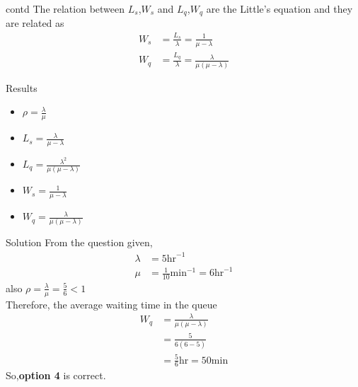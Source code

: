 \documentclass{beamer}
\begin{document}
\begin{frame}{contd}
    The relation between $L_s$,$W_s$ and $L_q$,$W_q$ are the Little's equation and they are related as
\begin{align}
    W_s&=\frac{L_s}{\lambda}=\frac{1}{\mu-\lambda}\\
    W_q&=\frac{L_q}{\lambda}=\frac{\lambda}{\mu(\mu-\lambda)}
\end{align}
\begin{block}{Results}
\begin{itemize}
    \item $\rho=\frac{\lambda}{\mu}$
    \item $L_s=\frac{\lambda}{\mu-\lambda}$
    \item $L_q=\frac{\lambda^2}{\mu(\mu-\lambda)}$
    \item $W_s=\frac{1}{\mu-\lambda}$
    \item $W_q=\frac{\lambda}{\mu(\mu-\lambda)}$
\end{itemize}
\end{block}
\end{frame}
\begin{frame}{Solution}
From the question given,
\begin{align*}
    \lambda &=5\text{hr}^{-1}\\
    \mu&=\frac{1}{10}\text{min}^{-1} =6\text{hr}^{-1}
    \end{align*}
also $\rho=\frac{\lambda}{\mu}=\frac{5}{6}<1$\\
Therefore, the average waiting time in the queue 
\begin{align*}
    W_q&=\frac{\lambda}{\mu(\mu-\lambda)}\\
    &=\frac{5}{6(6-5)}\\
    &=\frac{5}{6}\text{hr}=50\text{min}
\end{align*}
So,\textbf{option 4} is correct.
\end{frame}
\end{document}

